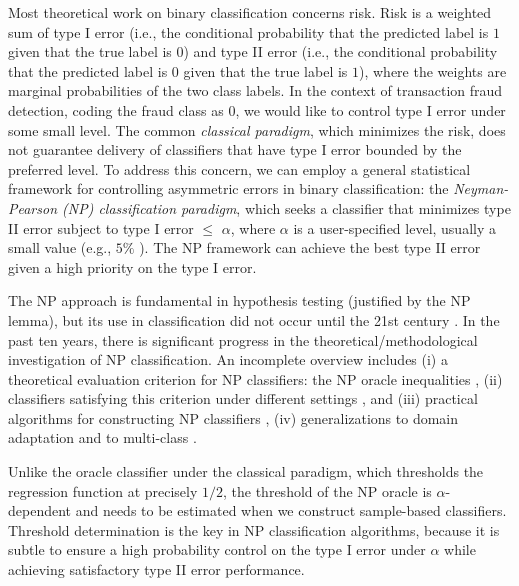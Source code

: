 \documentclass[12pt]{article}
\numberwithin{equation}{section}
\theoremstyle{remark}
\newcommand{\1}{{\rm 1}\kern-0.24em{\rm I}}
\begin{document}
Most theoretical work on binary classification concerns risk.  Risk is a weighted sum of type I error (i.e., the conditional probability that the predicted label is $1$ given that the true label is $0$) and type II error (i.e., the conditional probability that the predicted label is $0$ given that the true label is $1$), where the weights are marginal probabilities of the two class labels. In the context of transaction fraud detection, coding the fraud class as $0$, we would like to control type I error
 under some small level.  The common \textit{classical paradigm}, which minimizes the risk, does not guarantee delivery of classifiers that have type I error bounded by the preferred level.  To address this concern, we can employ a general statistical framework for controlling asymmetric errors in binary classification: the \textit{Neyman-Pearson (NP) classification paradigm}, which seeks a classifier that minimizes type II error subject to type I error $\leq$ $\alpha$, where $\alpha$ is a user-specified level, usually a small value (e.g., $5\%$ 
 ). The NP framework can achieve the best type II error given a high priority on the type I error. 
 
The NP approach is fundamental in hypothesis testing (justified by the NP lemma), but its use in classification did not occur until the 21st century \citep{cannon2002learning, scott2005neyman}.  In the past ten years, there is significant progress in the theoretical/methodological investigation of NP classification. An incomplete overview includes (i) a theoretical evaluation criterion for NP classifiers: the NP oracle inequalities \citep{rigollet2011neyman}, (ii) classifiers satisfying this criterion under different settings  \citep{tong2013plug, zhao2016neyman, Tong.Xia.Wang.Feng.2020}, and (iii) practical algorithms for constructing NP classifiers \citep{tong2018neyman, Tong.Xia.Wang.Feng.2020}, (iv) generalizations to domain adaptation \citep{Scott.2019} and to multi-class \citep{Tian.Feng.2021}.

 Unlike the oracle classifier under the classical paradigm, which thresholds the regression function at precisely $1/2$, the threshold of the NP oracle is $\alpha$-dependent and needs to be estimated when we construct sample-based classifiers. Threshold determination is the key in NP classification algorithms, because it is subtle to ensure a high probability control on the type I error under $\alpha$ while achieving satisfactory type II error performance.  
 
\end{document}
